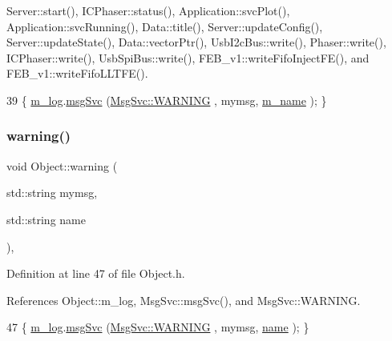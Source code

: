 Server\+::start(), I\+C\+Phaser\+::status(), Application\+::svc\+Plot(), Application\+::svc\+Running(), Data\+::title(), Server\+::update\+Config(), Server\+::update\+State(), Data\+::vector\+Ptr(), Usb\+I2c\+Bus\+::write(), Phaser\+::write(), I\+C\+Phaser\+::write(), Usb\+Spi\+Bus\+::write(), F\+E\+B\+\_\+v1\+::write\+Fifo\+Inject\+F\+E(), and F\+E\+B\+\_\+v1\+::write\+Fifo\+L\+L\+T\+F\+E().


\begin{DoxyCode}
39 \{ \hyperlink{classObject_a0d269813dd7ac1f24bc143031e2963f2}{m\_log}.\hyperlink{classMsgSvc_ad25f18047920cc59a314e5098259711c}{msgSvc} (\hyperlink{classMsgSvc_ae671eb7301996cd049d2da8a65925926a7cefae88f2ba26b2b05b676a383c834b}{MsgSvc::WARNING} , mymsg, \hyperlink{classObject_a8b83c95c705d2c3ba0d081fe1710f48d}{m\_name} ); \}
\end{DoxyCode}
\mbox{\label{classObject_a11f101db4dd73d9391b0231818881d86}} 
\subsubsection{\texorpdfstring{warning()}{warning()}\hspace{0.1cm}{\footnotesize\ttfamily [2/2]}}
{\footnotesize\ttfamily void Object\+::warning (\begin{DoxyParamCaption}\item[{std\+::string}]{mymsg,  }\item[{std\+::string}]{name }\end{DoxyParamCaption})\hspace{0.3cm}{\ttfamily [inline]}, {\ttfamily [inherited]}}



Definition at line 47 of file Object.\+h.



References Object\+::m\+\_\+log, Msg\+Svc\+::msg\+Svc(), and Msg\+Svc\+::\+W\+A\+R\+N\+I\+NG.


\begin{DoxyCode}
47 \{ \hyperlink{classObject_a0d269813dd7ac1f24bc143031e2963f2}{m\_log}.\hyperlink{classMsgSvc_ad25f18047920cc59a314e5098259711c}{msgSvc} (\hyperlink{classMsgSvc_ae671eb7301996cd049d2da8a65925926a7cefae88f2ba26b2b05b676a383c834b}{MsgSvc::WARNING} , mymsg, \hyperlink{classObject_a300f4c05dd468c7bb8b3c968868443c1}{name} ); \}
\end{DoxyCode}
\mbox{\label{classSpecsInterface_a33c7224b61bbb8d1ef20680f570ba4bd}} 

